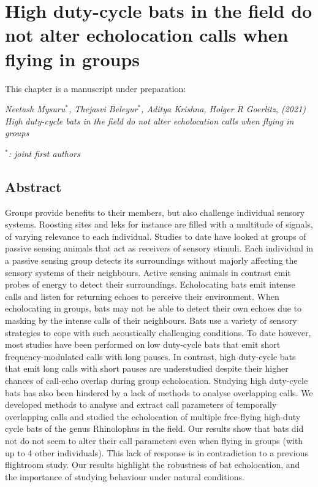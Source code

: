 \documentclass[
]{book}
\begin{document}
\begin{figure}
{}
\label{cpn_figS5}
\end{figure}

\hypertarget{hbcchapter}{%
\chapter{High duty-cycle bats in the field do not alter echolocation calls when flying in groups}\label{hbcchapter}}


This chapter is a manuscript under preparation:

\emph{Neetash Mysuru\(^{*}\), Thejasvi Beleyur\(^{*}\), Aditya Krishna, Holger R Goerlitz, (2021) High duty-cycle bats in the field do not alter echolocation calls when flying in groups}

\emph{\(^{*}\): joint first authors}

\newpage

\hypertarget{hbcabstract}{%
\section*{Abstract}\label{hbcabstract}}

Groups provide benefits to their members, but also challenge individual sensory systems. Roosting sites and leks for instance are filled with a multitude of signals, of varying relevance to each individual. Studies to date have looked at groups of passive sensing animals that act as receivers of sensory stimuli. Each individual in a passive sensing group detects its surroundings without majorly affecting the sensory systems of their neighbours. Active sensing animals in contrast emit probes of energy to detect their surroundings. Echolocating bats emit intense calls and listen for returning echoes to perceive their environment. When echolocating in groups, bats may not be able to detect their own echoes due to masking by the intense calls of their neighbours. Bats use a variety of sensory strategies to cope with such acoustically challenging conditions. To date however, most studies have been performed on low duty-cycle bats that emit short frequency-modulated calls with long pauses. In contrast, high duty-cycle bats that emit long calls with short pauses are understudied despite their higher chances of call-echo overlap during group echolocation. Studying high duty-cycle bats has also been hindered by a lack of methods to analyse overlapping calls. We developed methods to analyse and extract call parameters of temporally overlapping calls and studied the echolocation of multiple free-flying high-duty cycle bats of the genus Rhinolophus in the field. Our results show that bats did not do not seem to alter their call parameters even when flying in groups (with up to 4 other individuals). This lack of response is in contradiction to a previous flightroom study. Our results highlight the robustness of bat echolocation, and the importance of studying behaviour under natural conditions.
\end{document}
